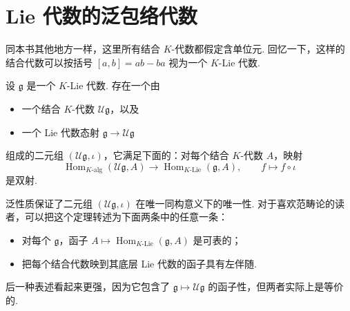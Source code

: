 \section{Lie 代数的泛包络代数}\label{sec:ssl-2-2}
同本书其他地方一样，这里所有结合 $K$-代数都假定含单位元. 回忆一下，这样的结合代数可以按括号 $[a, b] = ab - ba$ 视为一个 $K$-Lie 代数.
\begin{theorem}\label{thm:ssl-2-2-1}
设 $\mathfrak g$ 是一个 $K$-Lie 代数. 存在一个由
\begin{itemize}[label={}]
\item 一个结合 $K$-代数 $\mathcal{U}\mathfrak g$，以及
\item 一个 Lie 代数态射 $\mathfrak g \longrightarrow \mathcal{U}\mathfrak g$
\end{itemize}
组成的二元组 $(\mathcal{U}\mathfrak g, \iota)$，它满足下面的：对每个结合 $K$-代数 $A$，映射
\[\operatorname{Hom}_{K\text{-alg}}(\mathcal{U}\mathfrak g, A) \longrightarrow \operatorname{Hom}_{K\text{-Lie}}(\mathfrak g, A),\qquad f \longmapsto f \circ \iota\]
是双射.
\end{theorem}
泛性质保证了二元组 $(\mathcal{U}\mathfrak g, \iota)$ 在唯一同构意义下的唯一性. 对于喜欢范畴论的读者，可以把这个定理转述为下面两条中的任意一条：
\begin{itemize}[label={}]
\item 对每个 $\mathfrak g$，函子 $A \mapsto \operatorname{Hom}_{K\text{-Lie}}(\mathfrak g, A)$ 是可表的；
\item 把每个结合代数映到其底层 Lie 代数的函子具有左伴随.
\end{itemize}
后一种表述看起来更强，因为它包含了 $\mathfrak g \mapsto \mathcal{U}\mathfrak g$ 的函子性，但两者实际上是等价的.

